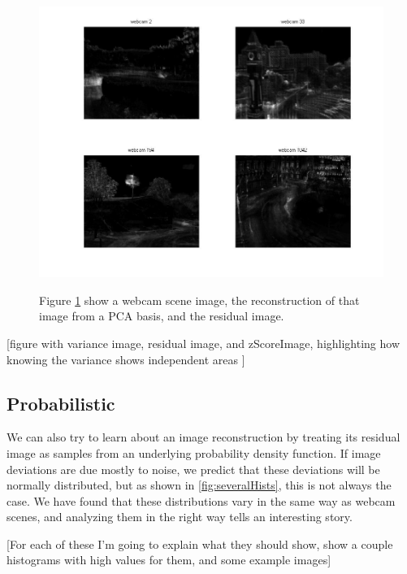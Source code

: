 \begin{figure}
	\centering
		\includegraphics[width=1\textwidth]{figures/severalVarianceImages.jpg}
	\label{fig:servalVarianceImages}
	
		\caption[Residual SSD Montage.]{Figure \ref{fig:servalVarianceImages} show a webcam scene image, the reconstruction of that image from a PCA basis, and the residual image.}
\end{figure}

[figure with variance image, residual image, and zScoreImage, highlighting how knowing the variance shows independent areas ]

\subsection{Probabilistic}

We can also try to learn about an image reconstruction by treating its residual image as samples from an 
underlying probability density function.  If image deviations are due mostly to noise, we predict that these deviations will be normally distributed, but as shown in \ref{fig:severalHists}, this is not always the case.  We have found that these distributions vary in the same way as webcam scenes, and analyzing them in the right way tells an interesting story.

[For each of these I'm going to explain what they should show, show a couple histograms with high values for them, and some example images]

